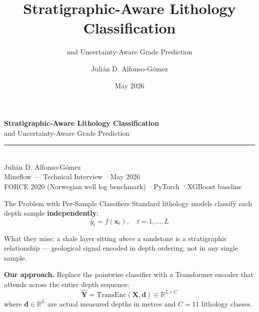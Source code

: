 \documentclass[aspectratio=169,11pt]{beamer}
\title{Stratigraphic-Aware Lithology Classification}
\subtitle{and Uncertainty-Aware Grade Prediction}
\author{Julián D. Alfonso-Gómez}
\institute{Mineflow — Technical Interview}
\date{May 2026}
\newcommand{\acc}[1]{{\color{Accent}#1}}
\newcommand{\mut}[1]{{\color{Muted}#1}}
\begin{document}
{
\begin{frame}[plain]
  \vfill
  {\Large\textbf{Stratigraphic-Aware Lithology Classification}}\\[0.4em]
  {\large and Uncertainty-Aware Grade Prediction}\\[1.5em]
  {\color{Rule}\rule{0.6\textwidth}{0.4pt}}\\[1em]
  Julián D. Alfonso-Gómez\\[0.3em]
  \mut{Mineflow — Technical Interview \quad·\quad May 2026}\\[2em]
  \mut{\footnotesize FORCE 2020 (Norwegian well log benchmark) \quad·\quad PyTorch \quad·\quad XGBoost baseline}
  \vfill
\end{frame}}

\begin{frame}{The Problem with Per-Sample Classifiers}
  Standard lithology models classify each depth sample \textbf{independently}:
  \[
    \hat{y}_t = f\!\left(\mathbf{x}_t\right), \quad t = 1, \ldots, L
  \]

  \vspace{0.8em}
  \acc{What they miss:} a shale layer sitting \emph{above} a sandstone is a stratigraphic relationship — geological signal encoded in depth ordering, not in any single sample.

  \vspace{1em}
  \textbf{Our approach.} Replace the pointwise classifier with a Transformer encoder that attends across the entire depth sequence:
  \[
    \hat{\mathbf{Y}} = \mathrm{TransEnc}\!\left(\mathbf{X}, \mathbf{d}\right) \in \mathbb{R}^{L \times C}
  \]
  where $\mathbf{d}\in\mathbb{R}^L$ are \acc{actual measured depths in metres} and $C=11$ lithology classes.
\end{frame}
\end{document}
